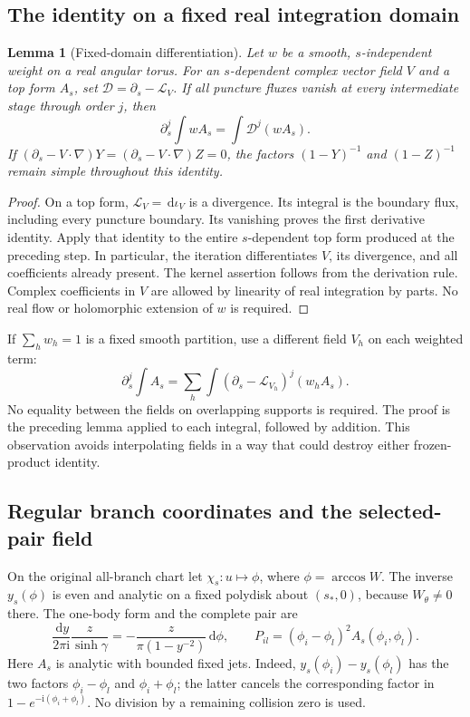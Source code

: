 \documentclass[11pt]{article}
\numberwithin{equation}{section}
\newtheorem{lemma}[theorem]{Lemma}
\theoremstyle{definition}
\newcommand{\dd}{\,\mathrm d}
\newcommand{\ii}{\mathrm i}
\newcommand{\Li}{\mathcal L}
\begin{document}
\subsection{The identity on a fixed real integration domain}
\begin{lemma}[Fixed-domain differentiation]\label{lem:lie}
Let \(w\) be a smooth, \(s\)-independent weight on a real angular torus.
For an \(s\)-dependent complex vector field \(V\) and a top form \(A_s\),
set \(\mathcal D=\partial_s-\Li_V\). If all puncture fluxes vanish
at every intermediate stage through order \(j\), then
\[
 \partial_s^j\int wA_s=\int\mathcal D^j(wA_s).
\]
If \((\partial_s-V\cdot\nabla)Y
=(\partial_s-V\cdot\nabla)Z=0\), the factors
\((1-Y)^{-1}\) and \((1-Z)^{-1}\) remain simple throughout this identity.
\end{lemma}
\begin{proof}
On a top form, \(\Li_V=\dd\iota_V\) is a divergence. Its integral is the
boundary flux, including every puncture boundary. Its vanishing proves
the first derivative identity. Apply that identity to the entire
\(s\)-dependent top form produced at the preceding step. In particular,
the iteration differentiates \(V\), its divergence, and all coefficients
already present. The kernel assertion follows from the derivation rule.
Complex coefficients in \(V\) are allowed by linearity of real
integration by parts. No real flow or holomorphic extension of \(w\)
is required.
\end{proof}

If \(\sum_h w_h=1\) is a fixed smooth partition, use a different field
\(V_h\) on each weighted term:
\begin{equation}
 \partial_s^j\int A_s
   =\sum_h\int(\partial_s-\Li_{V_h})^j(w_hA_s).
 \label{eq:chartwiseLie}
\end{equation}
No equality between the fields on overlapping supports is required.
The proof is the preceding lemma applied to each integral, followed
by addition. This observation avoids interpolating fields in a way
that could destroy either frozen-product identity.

\subsection{Regular branch coordinates and the selected-pair field}
On the original all-branch chart let \(\chi_s:u\mapsto\phi\), where
\(\phi=\arccos W\). The inverse \(y_s(\phi)\) is even and analytic
on a fixed polydisk about \((s_*,0)\), because \(W_\theta\ne0\) there.
The one-body form and the complete pair are
\begin{equation}
 \frac{\dd y}{2\pi\ii}\frac{z}{\sinh\gamma}
   =-\frac{z}{\pi(1-y^{-2})}\dd\phi,\qquad
 P_{il}=(\phi_i-\phi_l)^2 A_s(\phi_i,\phi_l).
 \label{eq:branchregular}
\end{equation}
Here \(A_s\) is analytic with bounded fixed jets. Indeed,
\(y_s(\phi_i)-y_s(\phi_l)\) has the two factors
\(\phi_i-\phi_l\) and \(\phi_i+\phi_l\); the latter cancels the
corresponding factor in \(1-e^{-\ii(\phi_i+\phi_l)}\).
No division by a remaining collision zero is used.
\end{document}
